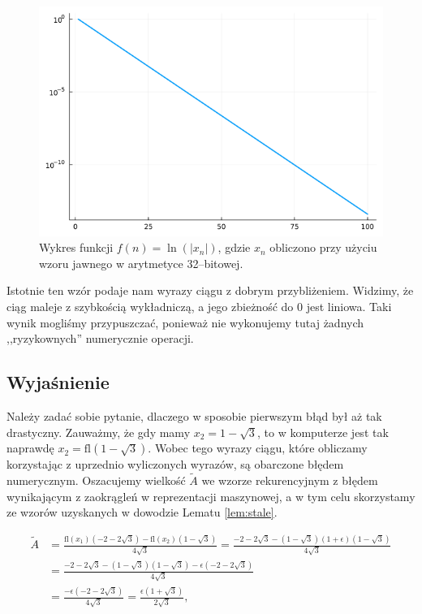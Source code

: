 \documentclass{article}
\begin{document}
\begin{figure}[!h]
    \centering
    \includegraphics[scale=0.4]{plot64_log_2.png}
    \caption{Wykres funkcji \(f(n) = \ln(|x_n|)\), gdzie \(x_n\) obliczono przy użyciu wzoru jawnego w arytmetyce 32--bitowej.}
    \label{fig:plot64_log_2}
\end{figure}

Istotnie ten wzór podaje nam wyrazy ciągu z dobrym przybliżeniem. Widzimy, że ciąg maleje z szybkością wykładniczą, a jego zbieżność do 0 jest liniowa. Taki wynik mogliśmy przypuszczać, ponieważ nie wykonujemy tutaj żadnych ,,ryzykownych'' numerycznie operacji. 

\newpage

\subsection{Wyjaśnienie}

Należy zadać sobie pytanie, dlaczego w sposobie pierwszym błąd był aż tak drastyczny. Zauważmy, że gdy mamy \(x_2 = 1 - \sqrt{3}\), to w komputerze jest tak naprawdę \(x_2 = \text{fl}(1 - \sqrt{3}) \). Wobec tego wyrazy ciągu, które obliczamy korzystając z uprzednio wyliczonych wyrazów, są obarczone błędem numerycznym. Oszacujemy wielkość \(\tilde{A}\) we wzorze rekurencyjnym z błędem wynikającym z zaokrągleń w reprezentacji maszynowej, a w tym celu skorzystamy ze wzorów uzyskanych w dowodzie Lematu \ref{lem:stale}.

\begin{align*}
    \tilde{A} &= \frac{\text{fl}(x_1)(-2-2\sqrt{3}) - \text{fl}(x_2)(1-\sqrt{3})}{4\sqrt{3}}
    = \frac{-2-2\sqrt{3} - (1-\sqrt{3})(1 + \epsilon)(1-\sqrt{3})}{4\sqrt{3}} \\
    &= \frac{-2-2\sqrt{3} - (1-\sqrt{3})(1-\sqrt{3}) -\epsilon(-2-2\sqrt{3})}{4\sqrt{3}} \\
    &=  \frac{-\epsilon(-2-2\sqrt{3})}{4\sqrt{3}} =  \frac{\epsilon(1+\sqrt{3})}{2\sqrt{3}} \text{,}
\end{align*}
\end{document}
